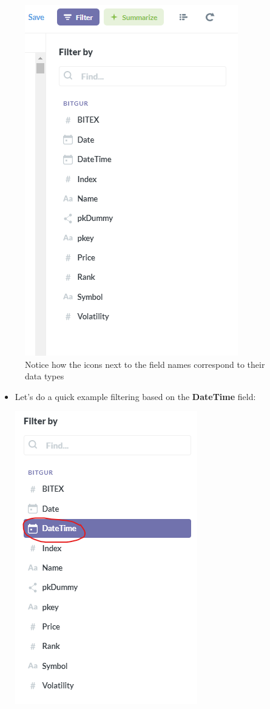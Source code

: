 \documentclass[]{book}
\begin{document}
\begin{itemize}
\begin{itemize}
    \begin{figure}
    \centering
    \includegraphics{images/FilterSidebar.png}
    \caption{Notice how the icons next to the field names correspond to their data types}
    \end{figure}

    \begin{itemize}
    \item
      Let's do a quick example filtering based on the \textbf{DateTime} field:

      \includegraphics{images/DateTimeClick.png}


\end{itemize}
\end{itemize}
\end{itemize}
\end{document}

